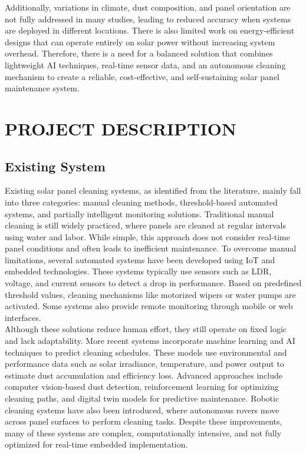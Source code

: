 \documentclass[10pt]{report}
\begin{document}
\begin{sloppypar}
{{{\begin{sloppypar}
Additionally, variations in climate, dust composition, and panel orientation are not fully addressed in
many studies, leading to reduced accuracy when systems are deployed in different
locations. There is also limited work on energy-efficient designs that can operate entirely on solar power without increasing system overhead. Therefore, there is a need
for a balanced solution that combines lightweight AI techniques, real-time sensor
data, and an autonomous cleaning mechanism to create a reliable, cost-effective, and
self-sustaining solar panel maintenance system.

\linespread{1.5}
\chapter{PROJECT DESCRIPTION}
\linespread{1.5}
\section{Existing System}
\hspace{0.5cm}
Existing solar panel cleaning systems, as identified from the literature, mainly
fall into three categories: manual cleaning methods, threshold-based automated systems, and partially intelligent monitoring solutions. Traditional manual cleaning is
still widely practiced, where panels are cleaned at regular intervals using water and
labor. While simple, this approach does not consider real-time panel conditions and
often leads to inefficient maintenance. To overcome manual limitations, several automated systems have been developed using IoT and embedded technologies. These
systems typically use sensors such as LDR, voltage, and current sensors to detect a
drop in performance. Based on predefined threshold values, cleaning mechanisms
like motorized wipers or water pumps are activated. Some systems also provide remote monitoring through mobile or web interfaces.\\

Although these solutions reduce
human effort, they still operate on fixed logic and lack adaptability. More recent
systems incorporate machine learning and AI techniques to predict cleaning schedules. These models use environmental and performance data such as solar irradiance,
temperature, and power output to estimate dust accumulation and efficiency loss.
Advanced approaches include computer vision-based dust detection, reinforcement
learning for optimizing cleaning paths, and digital twin models for predictive maintenance. Robotic cleaning systems have also been introduced, where autonomous
rovers move across panel surfaces to perform cleaning tasks. Despite these improvements, many of these systems are complex, computationally intensive, and not fully
optimized for real-time embedded implementation. 


\end{sloppypar}}}}
\end{sloppypar}
\end{document}
